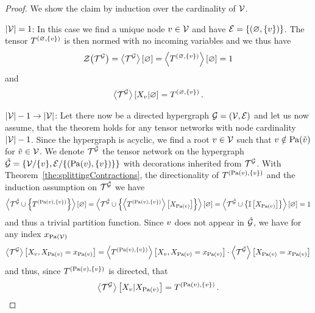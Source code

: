 \begin{proof}
	We show the claim by induction over the cardinality of $\mathcal{V}$.
	
	$\left|\mathcal{V}\right|=1$: In this case we find a unique node $v\in\mathcal{V}$ and have $\mathcal{E}=\{(\varnothing,\{v\})\}$.
		The tensor $T^{(\varnothing,\{v\})}$ is then normed with no incoming variables and we thus have
			\[ \mathcal{Z}{\left(\mathcal{T}^{\mathcal{G}}\right)} = \left\langle \mathcal{T}^{\mathcal{G}}\right\rangle \left[ \varnothing \right] = \left\langle T^{(\varnothing,\{v\})}\right\rangle \left[ \varnothing \right] = 1 \]
		and
			\[ \left\langle \mathcal{T}^{\mathcal{G}}\right\rangle \left[ X_{v} | \varnothing \right] = T^{(\varnothing,\{v\})} \, .  \]
			
	$\left|\mathcal{V}\right|-1 \rightarrow \left|\mathcal{V}\right|$: Let there now be a directed hypergraph $\mathcal{G}=(\mathcal{V},\mathcal{E})$ and let us now assume, that the theorem holds for any tensor networks with node cardinality $\left|\mathcal{V}\right|-1$.
		Since the hypergraph is acyclic, we find a root $v\in\mathcal{V}$ such that $v\notin\mathrm{Pa}(\tilde{v})$ for $\tilde{v}\in\mathcal{V}$.
		We denote $\mathcal{T}^{\tilde{\mathcal{G}}}$ the tensor network on the hypergraph $\tilde{\mathcal{G}}=\{\mathcal{V}/\{v\},\mathcal{E}/\{(\mathrm{Pa}(v),\{v\})\}\}$ with decorations inherited from $\mathcal{T}^{\mathcal{G}}$.
		With Theorem~\ref{the:splittingContractions}, the directionality of $T^{(\mathrm{Pa}(v),\{v\})}$ and the induction assumption on $\mathcal{T}^{\tilde{\mathcal{G}}}$ we have
		\begin{align*}
			\left\langle \mathcal{T}^{\tilde{\mathcal{G}}}\cup\left\{T^{(\mathrm{Pa}(v),\{v\})}\right\}\right\rangle \left[ \varnothing \right]
			 = \left\langle \mathcal{T}^{\tilde{\mathcal{G}}}\cup\left\{\left\langle T^{(\mathrm{Pa}(v),\{v\})}\right\rangle \left[ X_{\mathrm{Pa}(v)} \right]\right\}\right\rangle \left[ \varnothing \right]
			 = \left\langle \mathcal{T}^{\tilde{\mathcal{G}}}\cup\left\{\mathbb{I}\left[X_{\mathrm{Pa}(v)}\right]\right\}\right\rangle \left[ \varnothing \right]
			 = 1
		\end{align*}
		and thus a trivial partition function.
		Since $v$ does not appear in $\tilde{\mathcal{G}}$, we have for any index $x_{\mathrm{Pa}(\mathcal{V})}$
		\begin{align*}
			\left\langle \mathcal{T}^{\mathcal{G}}\right\rangle \left[ X_{v},X_{\mathrm{Pa}(v)}=x_{\mathrm{Pa}(v)} \right]
			= \left\langle T^{(\mathrm{Pa}(v),\{v\})}\right\rangle \left[ X_{v},X_{\mathrm{Pa}(v)}=x_{\mathrm{Pa}(v)} \right]
			\cdot \left\langle \mathcal{T}^{\tilde{\mathcal{G}}}\right\rangle \left[ X_{\mathrm{Pa}(v)}=x_{\mathrm{Pa}(v)} \right]
		\end{align*}
		and thus, since $T^{(\mathrm{Pa}(v),\{v\})}$ is directed, that
		\begin{align*}
			\left\langle \mathcal{T}^{\mathcal{G}}\right\rangle \left[ X_{v} | X_{\mathrm{Pa}(v)} \right]
			= T^{(\mathrm{Pa}(v),\{v\})} \, .
		\end{align*}
\end{proof}


